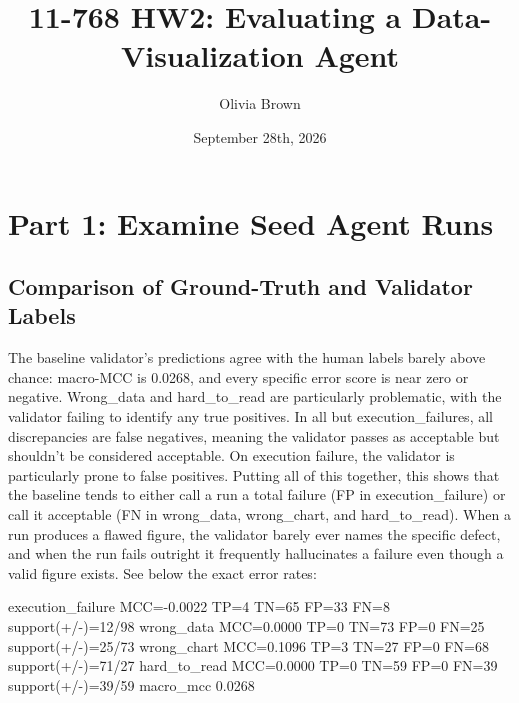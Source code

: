\documentclass[11pt]{article}
\title{11-768 HW2: Evaluating a Data-Visualization Agent}
\author{Olivia Brown}
\date{September 28th, 2026}
\begin{document}
\maketitle

\section{Part 1: Examine Seed Agent Runs}

\subsection{Comparison of Ground-Truth and Validator Labels}
The baseline validator's predictions agree with the human labels barely above chance: macro-MCC is 0.0268, and every specific error score is near zero or negative. Wrong_data and hard_to_read are particularly problematic, with the validator failing to identify any true positives. In all but execution_failures, all discrepancies are false negatives, meaning the validator passes as acceptable but shouldn't be considered acceptable. On execution failure, the validator is particularly prone to false positives. Putting all of this together, this shows that the baseline tends to either call a run a total failure (FP in execution_failure) or call it acceptable (FN in wrong_data, wrong_chart, and hard_to_read). When a run produces a flawed figure, the validator barely ever names the specific defect, and when the run fails outright it frequently hallucinates a failure even though a valid figure exists. See below the exact error rates:

    execution_failure    MCC=-0.0022  TP=4 TN=65 FP=33 FN=8  support(+/-)=12/98
    wrong_data           MCC=0.0000  TP=0 TN=73 FP=0 FN=25  support(+/-)=25/73
    wrong_chart          MCC=0.1096  TP=3 TN=27 FP=0 FN=68  support(+/-)=71/27
    hard_to_read         MCC=0.0000  TP=0 TN=59 FP=0 FN=39  support(+/-)=39/59
    macro_mcc            0.0268
\end{document}
